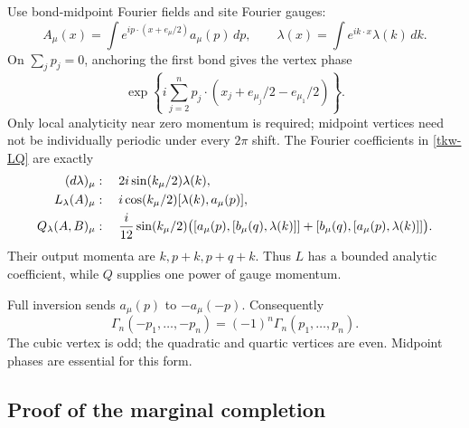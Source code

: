 Use bond-midpoint Fourier fields and site Fourier gauges:
\[
 A_\mu(x)=\int e^{ip\cdot(x+e_\mu/2)}a_\mu(p)\,dp,
 \qquad \lambda(x)=\int e^{ik\cdot x}\lambda(k)\,dk .
\]
On \(\sum_jp_j=0\), anchoring the first bond gives the vertex phase
\begin{equation}
 \exp\!\left\{i\sum_{j=2}^n
   p_j\cdot(x_j+e_{\mu_j}/2-e_{\mu_1}/2)\right\}.
 \label{tkw-vertex-phase}
\end{equation}
Only local analyticity near zero momentum is required; midpoint
vertices need not be individually periodic under every \(2\pi\)
shift. The Fourier coefficients in \eqref{tkw-LQ} are exactly
\begin{align}
 (d\lambda)_\mu&:\quad
       2i\sin(k_\mu/2)\lambda(k),\notag\\
 L_\lambda(A)_\mu&:\quad
       i\cos(k_\mu/2)[\lambda(k),a_\mu(p)],\notag\\
 Q_\lambda(A,B)_\mu&:\quad
       \frac{i}{12}\sin(k_\mu/2)
       \bigl([a_\mu(p),[b_\mu(q),\lambda(k)]]
           +[b_\mu(q),[a_\mu(p),\lambda(k)]]\bigr).
 \label{tkw-generator-phases}
\end{align}
Their output momenta are \(k,p+k,p+q+k\). Thus \(L\) has
a bounded analytic coefficient, while \(Q\) supplies one
power of gauge momentum.

Full inversion sends \(a_\mu(p)\) to \(-a_\mu(-p)\).
Consequently
\begin{equation}
 \Gamma_n(-p_1,\ldots,-p_n)
        =(-1)^n\Gamma_n(p_1,\ldots,p_n).
 \label{tkw-parity}
\end{equation}
The cubic vertex is odd; the quadratic and quartic vertices
are even. Midpoint phases are essential for this form.

\subsection{Proof of the marginal completion}
\label{tkw-completion-proof}

